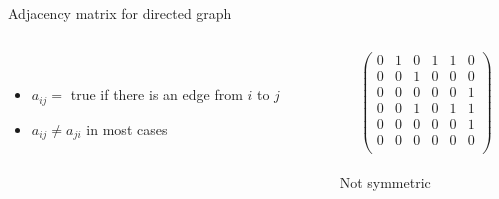 \documentclass[handout,code={Graphs I},title={Introduction, DFS, BFS}]{../share/cpslide}
\begin{document}
\begin{frame}{Adjacency matrix for directed graph}
\begin{columns}[T] %
\begin{column}[b]{0.6\linewidth}
\begin{minipage}{\linewidth}

\begin{figure}
\begin{adjustbox}{max totalsize={.4\textwidth}{.4\textheight}}
\\
\end{adjustbox}
\end{figure}

\begin{itemize}
\item $a_{ij} =$ true if there is an edge from $i$ to $j$
\item $a_{ij} \neq a_{ji}$ in most cases
\end{itemize}
\end{minipage}
\end{column}
\begin{column}[b]{0.4\linewidth}
\begin{minipage}{\linewidth}


$$
\begin{pmatrix}
0 & 1 & 0 & 1 & 1 & 0\\ 
0 & 0 & 1 & 0 & 0 & 0\\
0 & 0 & 0 & 0 & 0 & 1\\
0 & 0 & 1 & 0 & 1 & 1\\
0 & 0 & 0 & 0 & 0 & 1\\
0 & 0 & 0 & 0 & 0 & 0\\

\end{pmatrix}
$$\\
Not symmetric

\end{minipage}
\end{column}
\end{columns}

\end{frame}
\end{document}
